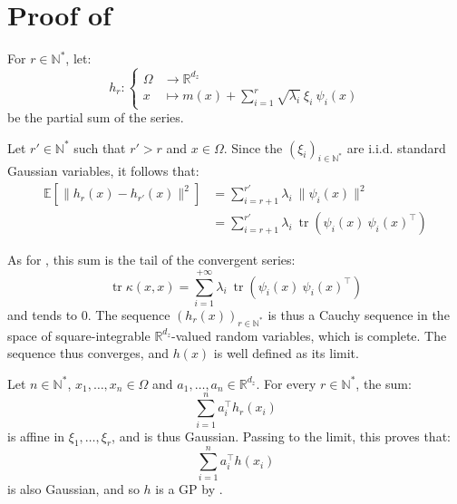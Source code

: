 \section[Proof of Proposition 3.20]{Proof of }\label{sec:proof_KL_converse}

For $r\in\mathbb{N}^*$, let:
\begin{equation}
	h_r:\left\{\begin{aligned}
	\Omega&\to\mathbb{R}^{d_z}\\
	x&\mapsto m(x)+\sum_{i=1}^r\sqrt{\lambda_i}\:\xi_i\:\psi_i(x)
	\end{aligned}\right.
\end{equation}
be the partial sum of the series.

Let $r'\in\mathbb{N}^*$ such that $r'>r$ and $x\in\Omega$. Since the $(\xi_i)_{i\in\mathbb{N}^*}$ are i.i.d. standard Gaussian variables, it follows that:
\begin{equation}
	\begin{aligned}
	\mathbb{E}\left[\|h_r(x)-h_{r'}(x)\|^2\right]&=\sum_{i=r+1}^{r'}\lambda_i\:\|\psi_i(x)\|^2\\
	&=\sum_{i=r+1}^{r'}\lambda_i\:\operatorname{tr}\left(\psi_i(x)\:\psi_i(x)^\top\right)
	\end{aligned}
\end{equation}

As for , this sum is the tail of the convergent series:
\begin{equation}
	\operatorname{tr}\kappa(x,x)=\sum_{i=1}^{+\infty}\lambda_i\:\operatorname{tr}\left(\psi_i(x)\:\psi_i(x)^\top\right)
\end{equation}
and tends to 0. The sequence $(h_r(x))_{r\in\mathbb{N}^*}$ is thus a Cauchy sequence in the space of square-integrable $\mathbb{R}^{d_z}$-valued random variables, which is complete. The sequence thus converges, and $h(x)$ is well defined as its limit.

Let $n\in\mathbb{N}^*$, $x_1,\dots,x_n\in\Omega$ and $a_1,\dots,a_n\in\mathbb{R}^{d_z}$. For every $r\in\mathbb{N}^*$, the sum:
\begin{equation}
	\sum_{i=1}^na_i^\top h_r(x_i)
\end{equation}
is affine in $\xi_1,\dots,\xi_r$, and is thus Gaussian. Passing to the limit, this proves that:
\begin{equation}
	\sum_{i=1}^na_i^\top h(x_i)
\end{equation}
is also Gaussian, and so $h$ is a GP by .

